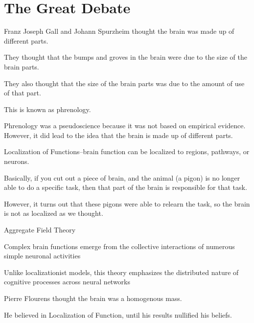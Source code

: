 \section{The Great Debate}

\begin{coloredlist}
    \item Franz Joseph Gall and Johann Spurzheim thought the brain was made up of different parts.
    \item They thought that the bumps and groves in the brain were due to the size of the brain parts.
    \item They also thought that the size of the brain parts was due to the amount of use of that part.
    \item This is known as phrenology.
    \begin{coloredlist}
        \item Phrenology was a pseudoscience because it was not based on empirical evidence.
        However, it did lead to the idea that the brain is made up of different parts.
    \end{coloredlist}
    \item Localization of Functions--brain function can be localized to regions, pathways, or neurons.
    \begin{coloredlist}
        \item Basically, if you cut out a piece of brain, and the animal (a pigon) is no longer able to do a specific task, then that part of the brain is responsible for that task.
        \item However, it turns out that these pigons were able to relearn the task, so the brain is not as localized as we thought.
    \end{coloredlist}
    \item Aggregate Field Theory
    \begin{coloredlist}
        \item Complex brain functions emerge from the collective interactions of numerous simple neuronal activities
        \item Unlike localizationist models, this theory emphasizes the distributed nature of cognitive processes across neural networks
    \end{coloredlist}
    \item Pierre Flourens thought the brain was a homogenous mass.
    \begin{coloredlist}
        \item He believed in Localization of Function, until his results nullified his beliefs.

\end{coloredlist}
\end{coloredlist}
